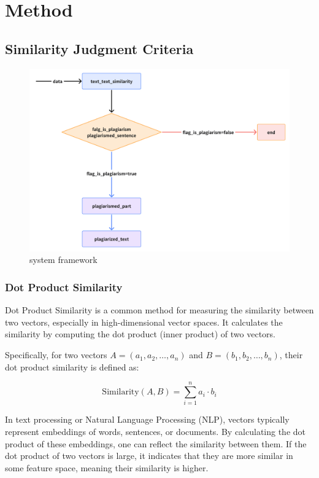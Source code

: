 \usepackage{pgfplots}
\usepackage{graphicx}
\usepackage{amsmath}


\section{Method}

\subsection{Similarity Judgment Criteria}

\begin{figure}[h]
    \centering
    \includegraphics[width=1\linewidth]{png/system_demo.png}
    \caption{system framework}
    \label{fig:1}
\end{figure}

\subsubsection{Dot Product Similarity}
Dot Product Similarity is a common method for measuring the similarity between two vectors, especially in high-dimensional vector spaces. It calculates the similarity by computing the dot product (inner product) of two vectors.

Specifically, for two vectors \( A = (a_1, a_2, \dots, a_n) \) and \( B = (b_1, b_2, \dots, b_n) \), their dot product similarity is defined as:

\[
\text{Similarity}(A, B) = \sum_{i=1}^{n} a_i \cdot b_i
\]

In text processing or Natural Language Processing (NLP), vectors typically represent embeddings of words, sentences, or documents. By calculating the dot product of these embeddings, one can reflect the similarity between them. If the dot product of two vectors is large, it indicates that they are more similar in some feature space, meaning their similarity is higher.

